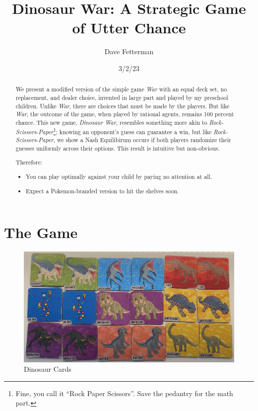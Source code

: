 \documentclass[11pt, oneside]{article} 	%
\title{Dinosaur War: A Strategic Game of Utter Chance}
\author{Dave Fetterman}
\affil{Obviously Unemployed}
\date{3/2/23}
\begin{document}
\maketitle

\begin{abstract}

We present a modified version of the simple game \emph{War} with an equal deck set, no replacement, and dealer choice, invented in large part and played by my preschool children.  Unlike  \emph{War}, there are choices that must be made by the players.  But like  \emph{War}, the outcome of the game, when played by rational agents, remains 100 percent chance.  This new game, \emph{Dinosaur War}, resembles something more akin to \emph{Rock-Scissors-Paper}\footnote{Fine, you call it ``Rock Paper Scissors''.  Save the pedantry for the math part.}; knowing an opponent's guess can guarantee a win, but like  \emph{Rock-Scissors-Paper}, we show a Nash Equilibirum occurs if both players randomize their guesses uniformly across their options.  This result is intuitive but non-obvious.

Therefore:
\begin{itemize}
\item You can play optimally against your child by paying no attention at all.
\item Expect a Pokemon-branded version to hit the shelves soon.
\end{itemize}

\end{abstract}

\section{The Game}


\begin{figure}
\centering
\includegraphics[scale=.3]{cards}
\caption{Dinosaur Cards}
\end{figure}
\end{document}
